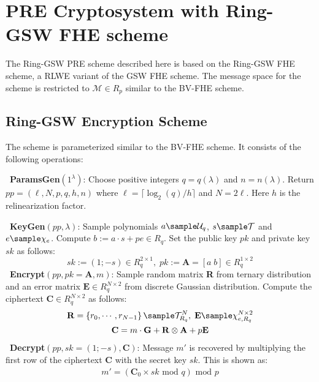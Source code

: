 \section{PRE Cryptosystem with Ring-GSW FHE scheme} \label{rgswpre}

The Ring-GSW PRE scheme described here is based on the Ring-GSW FHE  scheme, a RLWE variant of the GSW \cite{gentry2013homomorphic} FHE scheme. The message space for the scheme is restricted to $\mathcal{M} \in R_p$ similar to the BV-FHE scheme.

\subsection{Ring-GSW Encryption Scheme}

The scheme is parameterized similar to the BV-FHE scheme. It consists of the following operations:

\noindent \textbullet~\textbf{ParamsGen$\left(1^\lambda\right)$}: Choose positive integers $q = q\left(\lambda \right)$ and $n = n\left( \lambda \right)$. Return $pp = \left(\ell,N,p,q,h,n\right)$ where $\ell = \lceil \log_2{(q)} /h \rceil$ and $N = 2\ell$. Here $h$ is the relinearization factor.

\noindent \textbullet~\textbf{KeyGen$\left(pp, \lambda \right)$}: Sample polynomials $a \sample \mathcal{U}_q$, $s \sample \mathcal{T}$ and $e \sample \chi_e$. Compute $b := a\cdot s + pe \in R_q$. Set the public key $pk$ and private key $sk$ as follows: $$sk := \left( 1; -s \right) \in R_q^{2 \times 1}, \; pk := \mathbf{A} = \left[a\;b\right] \in R_q^{1\times2}$$
\noindent \textbullet~\textbf{Encrypt$\left(pp, pk = \mathbf{A}, m \right)$}: Sample random matrix \textbf{R} from  ternary distribution and an error matrix $\mathbf{E} \in R_q^{N \times 2}$ from  discrete Gaussian
distribution. Compute the ciphertext $\mathbf{C} \in R_q^{N \times 2}$ as follows: 
\begin{equation*}
\begin{gathered}
\mathbf{R} =  \left\{ r_0, \cdots , r_{N - 1}\right\} \sample \mathcal{T}_{R_q}^N , \; \mathbf{E} \sample \chi_{e,R_q}^{N \times 2} \\
 \mathbf{C}  = m\cdot \mathbf{G} + \mathbf{R}\otimes \mathbf{A} + p\mathbf{E}
\end{gathered}
\end{equation*}
\noindent \textbullet~\textbf{Decrypt}$\left(pp, sk = \left( 1; -s \right), \mathbf{C} \right)$:   Message $m'$ is recovered by multiplying the first row of the ciphertext \textbf{C} with the secret key $sk$. This is
shown as:
\begin{gather*}
m' = \left( \mathbf{C}_0 \times sk \text{ mod } q\right) \text{ mod } p
\end{gather*}

